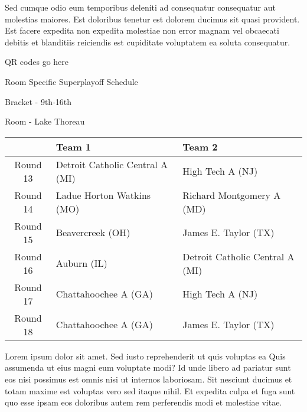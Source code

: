 \documentclass{article}%
\begin{document}
\newline%
Sed cumque odio eum temporibus deleniti ad consequatur consequatur aut molestias maiores. Est doloribus tenetur est dolorem ducimus sit quasi provident. Est facere expedita non expedita molestiae non error magnam vel obcaecati debitis et blanditiis reiciendis est cupiditate voluptatem ea soluta consequatur.%
\vspace*{140pt}%
\begin{center}%
\begin{Huge}%
QR codes go here%
\end{Huge}%
\end{center}%
\newpage%
\begin{center}%
\begin{Huge}%
Room Specific Superplayoff Schedule%
\end{Huge}%
\vspace*{8pt}%
\linebreak%
\begin{Large}%
Bracket {-} 9th{-}16th%
\end{Large}%
\vspace*{8pt}%
\linebreak%
\vspace*{8pt}%
\begin{Large}%
Room {-} Lake Thoreau%
\end{Large}%
\end{center}%
%
\begin{tabularx}{\textwidth}{|c|Y|Y|}%
\hline%
&Team 1&Team 2\\%
\hline%
Round 13&Detroit Catholic Central A (MI)&High Tech A (NJ)\\%
Round 14&Ladue Horton Watkins (MO)&Richard Montgomery A (MD)\\%
Round 15&Beavercreek (OH)&James E. Taylor (TX)\\%
Round 16&Auburn (IL)&Detroit Catholic Central A (MI)\\%
Round 17&Chattahoochee A (GA)&High Tech A (NJ)\\%
Round 18&Chattahoochee A (GA)&James E. Taylor (TX)\\%
\hline%
\end{tabularx}%
\vspace*{8pt}%
\newline%
Lorem ipsum dolor sit amet. Sed iusto reprehenderit ut quis voluptas ea Quis assumenda ut eius magni eum voluptate modi? Id unde libero ad pariatur sunt eos nisi possimus est omnis nisi ut internos laboriosam. Sit nesciunt ducimus et totam maxime est voluptas vero sed itaque nihil. Et expedita culpa et fuga sunt quo esse ipsam eos doloribus autem rem perferendis modi et molestiae vitae.\newline%
\end{document}
